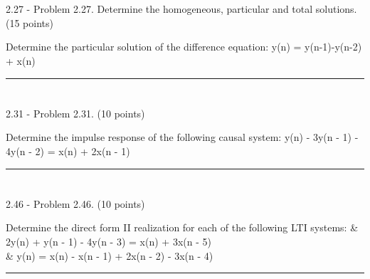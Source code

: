\documentclass[a4paper, 11pt]{exam}
\begin{document}
\section{}
2.27 - Problem 2.27. Determine the homogeneous, particular and total solutions. (15 points)\\
\begin{eqnsection}{-3em}{Determine the particular solution of the difference equation:}
  y(n) = y(n-1)-y(n-2) + x(n)\\
\end{eqnsection}
\vspace{2em}
\hrule
\section{}
2.31 - Problem 2.31. (10 points)\\
\begin{eqnsection}{-3em}{Determine the impulse response of the following causal system:}
  y(n) - 3y(n - 1) - 4y(n - 2) = x(n) + 2x(n - 1)
\end{eqnsection}
\vspace{2em}
\hrule
\section{}
2.46 - Problem 2.46. (10 points)\\
\begin{eqnsection}{-3em}{Determine the direct form II realization for each of the following LTI systems:}
  & 2y(n) + y(n - 1) - 4y(n - 3) = x(n) + 3x(n - 5)\\
  & y(n) = x(n) - x(n - 1) + 2x(n - 2) - 3x(n - 4)
\end{eqnsection}
\vspace{2em}
\hrule
\end{document}
